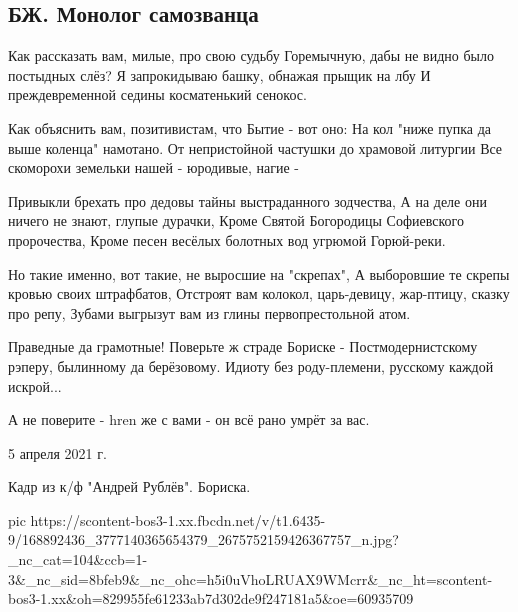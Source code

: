  
 
 
 
 

\subsection{БЖ. Монолог самозванца}

Как рассказать вам, милые, про свою судьбу 
Горемычную, дабы не видно было постыдных слёз?
Я запрокидываю башку, обнажая прыщик на лбу
И преждевременной седины косматенький сенокос.

Как объяснить вам, позитивистам, что Бытие - вот оно:
На кол "ниже пупка да выше коленца" намотано.
От непристойной частушки до храмовой литургии
Все скоморохи земельки нашей - юродивые, нагие -

Привыкли брехать про дедовы тайны выстраданного зодчества,
А на деле они ничего не знают, глупые дурачки,
Кроме Святой Богородицы Софиевского пророчества,
Кроме песен весёлых болотных вод угрюмой Горюй-реки.

Но такие именно, вот такие, не выросшие на "скрепах",
А выборовшие те скрепы кровью своих штрафбатов,
Отстроят вам колокол, царь-девицу, жар-птицу, сказку про репу,
Зубами выгрызут вам из глины первопрестольной атом.

Праведные да грамотные! Поверьте ж страде Бориске -
Постмодернистскому рэперу, былинному да берёзовому.
Идиоту без роду-племени, русскому каждой искрой...

А не поверите - hren же с вами - он всё рано умрёт за вас.

5 апреля 2021 г.

Кадр из к/ф "Андрей Рублёв". Бориска.

\ifcmt
  pic https://scontent-bos3-1.xx.fbcdn.net/v/t1.6435-9/168892436_3777140365654379_2675752159426367757_n.jpg?_nc_cat=104&ccb=1-3&_nc_sid=8bfeb9&_nc_ohc=h5i0uVhoLRUAX9WMcrr&_nc_ht=scontent-bos3-1.xx&oh=829955fe61233ab7d302de9f247181a5&oe=60935709
\fi

